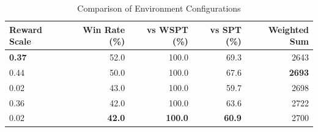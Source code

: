 \begin{table}[htbp]%
\centering%
\begin{tabular}{lrrrr}%
\toprule%
\textbf{Reward Scale}&\textbf{Win Rate (\%)}&\textbf{vs WSPT (\%)}&\textbf{vs SPT (\%)}&\textbf{Weighted Sum}\\%
\midrule%
\textbf{0.37}&52.0&100.0&69.3&2643\\%
0.44&50.0&100.0&67.6&\textbf{2693}\\%
0.02&43.0&100.0&59.7&2698\\%
0.36&42.0&100.0&63.6&2722\\%
0.02&\textbf{42.0}&\textbf{100.0}&\textbf{60.9}&2700\\%
\bottomrule%
\end{tabular}%
\caption{Comparison of Environment Configurations}%
\label{tab:environment}%
\end{table}